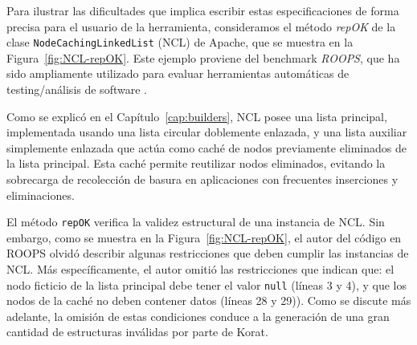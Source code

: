 Para ilustrar las dificultades que implica escribir estas especificaciones de
forma precisa para el usuario de la herramienta, consideramos el método 
\emph{repOK} de la clase \texttt{NodeCachingLinkedList} (NCL) de Apache, que se
muestra en la Figura~\ref{fig:NCL-repOK}. 
Este ejemplo proviene del benchmark \emph{ROOPS}, que ha sido ampliamente
utilizado para evaluar herramientas automáticas de testing/análisis de software 
\cite{Pasareanu:2010,Rosner15,Galeotti:2010,galeotti2020,Boyapati02,Khurshid01}.

Como se explicó en el Capítulo~\ref{cap:builders}, NCL posee una lista
principal, implementada usando una lista circular doblemente enlazada, 
y una lista auxiliar simplemente enlazada que actúa como caché de nodos
previamente eliminados de la lista principal. Esta caché permite reutilizar 
nodos eliminados, evitando la sobrecarga de recolección de basura en aplicaciones con frecuentes inserciones y eliminaciones.

El método \texttt{repOK} verifica la validez estructural de una instancia de
NCL. Sin embargo, como se muestra en la Figura~\ref{fig:NCL-repOK}, el
autor del código en ROOPS olvidó describir algunas restricciones que deben
cumplir las instancias de NCL. Más específicamente, el autor omitió las
restricciones que indican que: el nodo ficticio de la lista principal debe tener el
valor \texttt{null} (líneas 3 y 4), y que los nodos de la caché no deben 
contener datos (líneas 28 y 29)). Como se discute más adelante, la omisión de estas 
condiciones conduce a la generación de una gran cantidad de estructuras
inválidas por parte de Korat.

